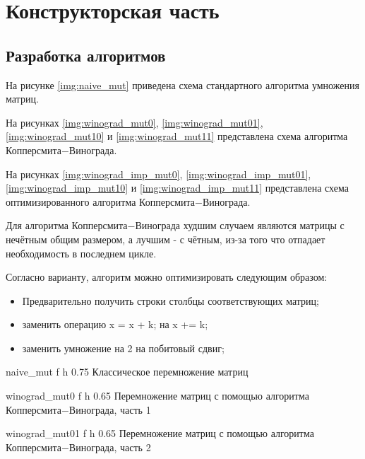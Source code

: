 \chapter{Конструкторская часть}

\section{Разработка алгоритмов}

На рисунке \ref{img:naive_mut} приведена схема стандартного алгоритма умножения матриц.

На рисунках \ref{img:winograd_mut0}, \ref{img:winograd_mut01}, \ref{img:winograd_mut10} и \ref{img:winograd_mut11} представлена схема алгоритма Копперсмита$-$Винограда.

На рисунках \ref{img:winograd_imp_mut0}, \ref{img:winograd_imp_mut01}, \ref{img:winograd_imp_mut10} и \ref{img:winograd_imp_mut11} представлена схема оптимизированного алгоритма Копперсмита$-$Винограда.

Для алгоритма Копперсмита$-$Винограда худшим случаем являются матрицы с нечётным общим размером, а лучшим - с чётным,
из-за того что отпадает необходимость в последнем цикле.

Согласно варианту, алгоритм можно оптимизировать следующим образом:
\begin{itemize}
    \item Предварительно получить строки столбцы соответствующих матриц;
    \item заменить операцию x = x + k; на x += k;
    \item заменить умножение на 2 на побитовый сдвиг;
\end{itemize}

{naive_mut} %
{f} %
{h} %
{0.75\textwidth} %
{Классическое перемножение матриц} %
\clearpage

{winograd_mut0} %
{f} %
{h} %
{0.65\textwidth} %
{Перемножение матриц с помощью алгоритма Копперсмита$-$Винограда, часть 1} %
\clearpage

{winograd_mut01} %
{f} %
{h} %
{0.65\textwidth} %
{Перемножение матриц с помощью алгоритма Копперсмита$-$Винограда, часть 2} %
\clearpage


